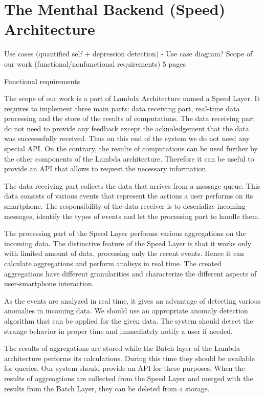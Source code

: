 \chapter{The Menthal Backend (Speed) Architecture}
\label{chap:menthal_backend_architecture}


Use cases (quantified self + depression detection) - Use case diagram?
Scope of our work (functional/nonfunctional requirements)
5 pages

Functional requirements

The scope of our work is a part of Lambda Architecture named a Speed Layer.
It requires to implement three main parts: data receiving part, real-time data processing and the store of the results of computations.
The data receiving part do not need to provide any feedback except the acknoledgement that the data was succeessfully received.
Thus on this end of the system we do not need any special API.
On the contrary, the results of computations can be used further by the other components of the Lambda architecture.
Therefore it can be useful to provide an API that allows to request the necessary information.

The data receiving part collects the data that arrives from a message queue.
This data consists of various events that represent the actions a user performs on its smartphone. 
The responsibility of the data receiver is to deserialize incoming messages, identify the types of events and let the processing part to handle them.

The processing part of the Speed Layer performs various aggregations on the incoming data.
The distinctive feature of the Speed Layer is that it works only with limited amount of data, processing only the recent events.
Hence it can calculate aggregations and perform analisys in real time.
The created aggregations have different granularities and characterize the different aspects of user-smartphone interaction.

As the events are analyzed in real time, it gives an advantage of detecting various anomalies in incoming data.
We should use an appropriate anomaly detection algorithm that can be applied for the given data.
The system should detect the strange behavior in proper time and immediately notify a user if needed.

The results of aggregations are stored while the Batch layer of the Lambda architecture performs its calculations.
During this time they should be available for queries.
Our system should provide an API for these purposes.
When the results of aggreagtions are collected from the Speed Layer and merged with the results from the Batch Layer, they can be deleted from a storage.
 
